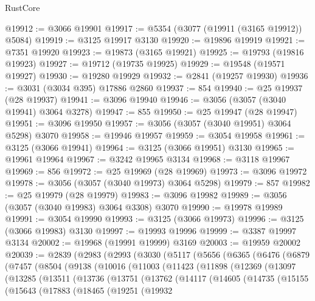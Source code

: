 \begin{lexlean}{RustCore}
\begin{coremodule}
@19912 := @3066 @19901
@19917 := @5354 (@3077 (@19911 (@3165 @19912)) @5084)
@19919 := @3125 @19917 @3130
@19920 := @19896 @19919
@19921 := @7351 @19920
@19923 := @19873 (@3165 @19921)
@19925 := @19793 (@19816 @19923)
@19927 := @19712 (@19735 @19925)
@19929 := @19548 (@19571 @19927)
@19930 := @19280 @19929
@19932 := @2841 (@19257 @19930)
@19936 := @3031 (@3034 @395) @17886 @2860
@19937 := 854
@19940 := @25 @19937 (@28 @19937)
@19941 := @3096 @19940
@19946 := @3056 (@3057 (@3040 @19941) @3064 @3278)
@19947 := 855
@19950 := @25 @19947 (@28 @19947)
@19951 := @3096 @19950
@19957 := @3056 (@3057 (@3040 @19951) @3064 @5298) @3070
@19958 := @19946 @19957
@19959 := @3054 @19958
@19961 := @3125 (@3066 @19941)
@19964 := @3125 (@3066 @19951) @3130
@19965 := @19961 @19964
@19967 := @3242 @19965 @3134
@19968 := @3118 @19967
@19969 := 856
@19972 := @25 @19969 (@28 @19969)
@19973 := @3096 @19972
@19978 := @3056 (@3057 (@3040 @19973) @3064 @5298)
@19979 := 857
@19982 := @25 @19979 (@28 @19979)
@19983 := @3096 @19982
@19989 := @3056 (@3057 (@3040 @19983) @3064 @3308) @3070
@19990 := @19978 @19989
@19991 := @3054 @19990
@19993 := @3125 (@3066 @19973)
@19996 := @3125 (@3066 @19983) @3130
@19997 := @19993 @19996
@19999 := @3387 @19997 @3134
@20002 := @19968 (@19991 @19999) @3169
@20003 := @19959 @20002
@20039 := @2839
    (@2983
      (@2993
        (@3030
          (@5117
            (@5656
              (@6365
                (@6476
                  (@6879
                    (@7457
                      (@8504
                        (@9138
                          (@10016
                            (@11003
                              (@11423
                                (@11898
                                  (@12369
                                    (@13097
                                      (@13285
                                        (@13511
                                          (@13736
                                            (@13751
                                              (@13762
                                                (@14117
                                                  (@14605
                                                    (@14735
                                                      (@15155
                                                        (@15643
                                                          (@17883
                                                            (@18465
                                                              (@19251
                                                                (@19932

\end{coremodule}
\end{lexlean}
